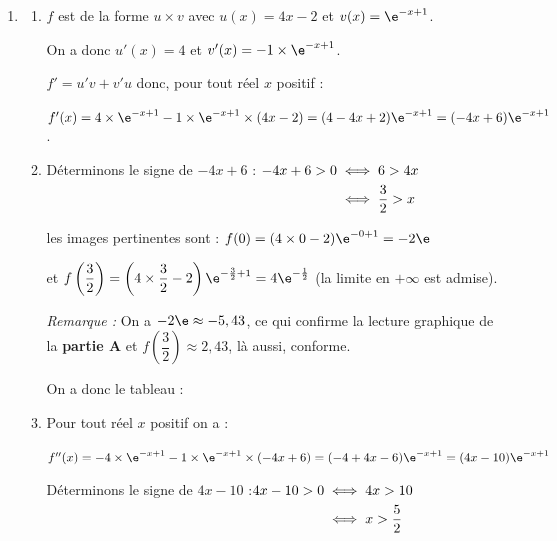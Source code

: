 \begin{enumerate}
	\item
	\begin{enumerate}
		\item  $f$ est de la forme $u\times v$ avec $u(x)=4x-2$ et $v(x)=\e^{-x+1}$.

		On a donc $u'(x)= 4$ et $v'(x)=-1 \times \e^{-x+1}$.

		$f'= u'v + v'u$ donc, pour tout réel $x$ positif :

		 $f'(x) = 4 \times \e^{-x+1} -1 \times \e^{-x+1} \times (4x-2)= (4-4x+2)\e^{-x+1} = (-4x+6)\e^{-x+1}$.

		\item  Déterminons le signe de $-4x+6$ : \quad $\aligned[t] -4x+6 >0 &\iff  6 > 4x \\
		&\iff \dfrac{3}{2}>x\endaligned$

		les images pertinentes sont : \quad
		$f(0)= (4\times 0 -2) \e ^{-0+1}= -2\e$

		et \quad
		$f\left( \dfrac{3}{2}\right)=  \left(4 \times \dfrac{3}{2}-2\right)\e^{-\frac{3}{2}+1}=4\e^{-\frac{1}{2}}$ \quad (la limite en $+\infty$ est admise).

		\emph{Remarque :} On a $-2\e \approx -5,43$, ce qui confirme la lecture graphique de la \textbf{partie A} \linebreak et $ f\left(\dfrac{3}{2}\right)\approx 2,43 $, là aussi, conforme.


		On a donc le tableau :

		\begin{center}
		\end{center}


		\item  Pour tout réel $x$ positif on a :

		$f''(x)= -4 \times \e^{-x+1} -1 \times \e^{-x+1} \times (-4x+6)= (-4+4x-6)\e^{-x+1}= (4x-10)\e^{-x+1}$


		Déterminons le signe de  $4x-10$ :\quad $\aligned[t] 4x-10 >0 &\iff  4x > 10 \\
		&\iff x>\dfrac{5}{2}\endaligned$

		\begin{center}
		\end{center}


\end{enumerate}
\end{enumerate}
